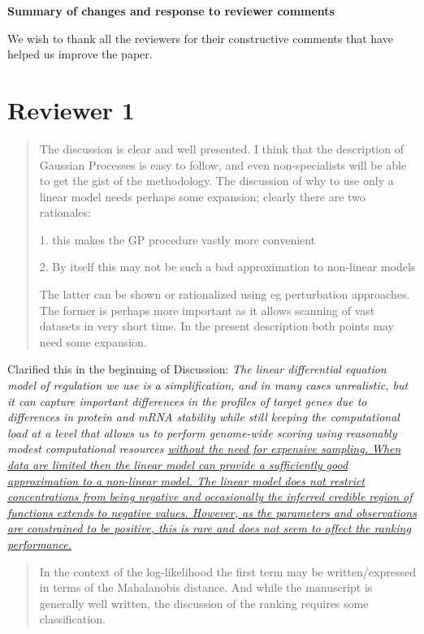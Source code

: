 \documentclass{article}
\begin{document}
\begin{center}
\textbf{\LARGE Summary of changes and response to reviewer comments}
\end{center}

We wish to thank all the reviewers for their constructive comments
that have helped us improve the paper.

\section*{Reviewer 1}

  \begin{quote}
    The discussion is clear and well presented. I think that the
    description of Gaussian Processes is easy to follow, and even
    non-specialists will be able to get the gist of the
    methodology. The discussion of why to use only a linear model
    needs perhaps some expansion; clearly there are two rationales:

1. this makes the GP procedure vastly more convenient 

2. By itself this may not be such a bad approximation to non-linear models 

The latter can be shown or rationalized using eg perturbation
approaches. The former is perhaps more important as it allows scanning
of vast datasets in very short time. In the present description both
points may need some expansion.
  \end{quote}

Clarified this in the beginning of Discussion:
\emph{The linear differential equation model of regulation we use
is a simplification, and in many cases unrealistic, but it can capture important differences in
the profiles of target genes due to differences in protein and mRNA
stability while still keeping the computational load at a level
that allows us to perform genome-wide scoring using reasonably modest
computational resources \ul{without the need for expensive sampling.
When data are limited then the linear model can provide a sufficiently good
approximation to a non-linear model. The linear model does not restrict concentrations from being negative
and occasionally the inferred credible region of functions extends to negative
values. However, as the parameters and observations are constrained to be positive,
this is rare and does not seem to affect the ranking performance.}}

\begin{quote} In the context of the log-likelihood the first
    term may be written/expressed in terms of the Mahalanobis
    distance. And while the manuscript is generally well written, the
    discussion of the ranking requires some classification.
  \end{quote}
\end{document}
